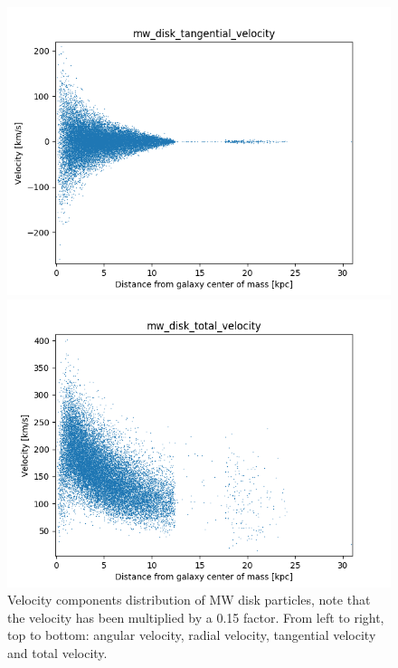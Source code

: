 \documentclass[a4paper,12pt, english]{article}
\begin{document}
\begin{figure}
\begin{minipage}{0.45\textwidth}
\includegraphics[width=1\textwidth]{VelocityDistr/mw_disk_tangential_velocity.png}
\end{minipage}
\begin{minipage}{0.45\textwidth}
  \centering
\includegraphics[width=1\textwidth]{VelocityDistr/mw_disk_total_velocity.png}
\end{minipage}
\caption{Velocity components distribution of MW disk particles, note that the velocity has been multiplied by a 0.15 factor. From left to right, top to bottom: angular velocity, radial velocity, tangential velocity and total velocity.}
\label{fig:disk-vel}
\end{figure}
\end{document}
